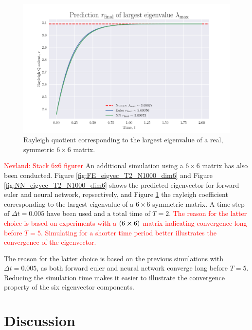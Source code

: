 \documentclass[12pt]{extarticle}
\begin{document}
\begin{figure}[h]
	\centering
	\includegraphics[scale=0.6]{../output/plots/eigval_T2_N1000_dim6.pdf}
	\caption{Rayleigh quotient corresponding to the largest eigenvalue of a real, symmetric $6\times 6$ matrix.}
	\label{fig:eigval_T2_N1000_dim6}
\end{figure}

\textcolor{red}{Nevland: Stack 6x6 figurer} An additional simulation using a $6\times 6$ matrix has also been conducted. Figure \ref{fig:FE_eigvec_T2_N1000_dim6} and Figure \ref{fig:NN_eigvec_T2_N1000_dim6} shows the predicted eigenvector for forward euler and neural network, repsectively, and Figure \ref{fig:eigval_T2_N1000_dim6} the rayleigh coefficient corresponding to the largest eigenvalue of a $6\times 6$ symmetric matrix. A time step of $\Delta t = 0.005$ have been used and a total time of $T=2$. \textcolor{red}{The reason for the latter choice is based on experiments with a $(6 \cross 6)$ matrix indicating convergence long before $T=5$. Simulating for a shorter time period better illustrates the convergence of the eigenvector.}

The reason for the latter choice is based on the previous simulations with $\Delta t=0.005$, as both forward euler and neural network converge long before $T=5$. Reducing the simulation time makes it easier to illustrate the convergence property of the six eigenvector components.
 
 
\clearpage
\section{Discussion}
\end{document}
